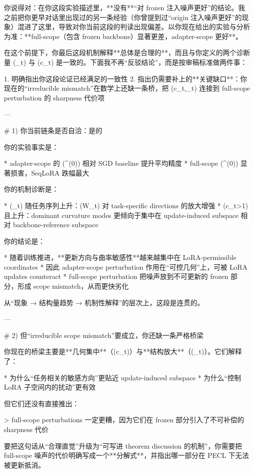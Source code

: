 你说得对：在你这段实验描述里，**没有**“对 frozen 注入噪声更好”的结论。我之前把你更早对话里出现过的另一条经验（你曾提到过“origin 注入噪声更好”的现象）混进了这里，导致对你当前这段的判读出现偏差。以你现在给出的实验与分析为准：**full-scope（包含 frozen backbone）显著更差，adapter-scope 更好**。

在这个前提下，你最后这段机制解释**总体是合理的**，而且与你定义的两个诊断量 (\alpha_t) 与 (c_t) 是一致的。下面我不再“反驳结论”，而是按审稿标准做两件事：

1. 明确指出你这段论证已经满足的一致性
2. 指出仍需要补上的**关键缺口**：你现在的“irreducible mismatch”在数学上还缺一条桥，把 (c_t,\alpha_t) 连接到 full-scope perturbation 的 sharpness 代价项

---

# 1) 你当前链条是否自洽：是的

你的实验事实是：

* adapter-scope 的 (^{(0)}) 相对 SGD baseline 提升平均精度
* full-scope (^{(0)}) 显著损害，SeqLoRA 跌幅最大

你的机制诊断是：

* (\alpha_t) 随任务序列上升：(\Delta W_t) 对 task-specific directions 的放大增强
* (c_t>1) 且上升：dominant curvature modes 更倾向于集中在 update-induced subspace 相对 backbone-reference subspace

你的结论是：

* 随着训练推进，**更新方向与曲率敏感性**越来越集中在 LoRA-permissible coordinates
* 因此 adapter-scope perturbation 作用在“可控几何”上，可被 LoRA updates counteract
* full-scope perturbation 把噪声放到不可更新的 frozen 部分，形成 scope mismatch，从而更快劣化

从“现象 → 结构量趋势 → 机制性解释”的层次上，这段是连贯的。

---

# 2) 但“irreducible scope mismatch”要成立，你还缺一条严格桥梁

你现在的桥梁主要是**几何集中**（(c_t)）与**结构放大**（(\alpha_t)）。它们解释了：

* 为什么“任务相关的敏感方向”更贴近 update-induced subspace
* 为什么“控制 LoRA 子空间内的扰动”更有效

但它们还没有直接推出：

> full-scope perturbations 一定更糟，因为它们在 frozen 部分引入了不可补偿的 sharpness 代价

要把这句话从“合理直觉”升级为“可写进 theorem discussion 的机制”，你需要把 full-scope 噪声的代价明确写成一个**分解式**，并指出哪一部分在 PECL 下无法被更新抵消。

